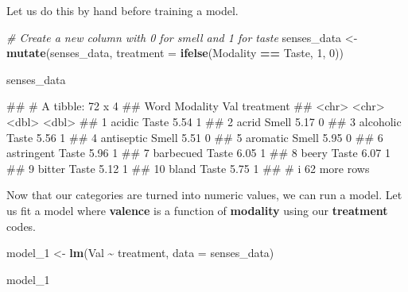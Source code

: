 \documentclass[
]{book}
\newenvironment{Shaded}{\begin{snugshade}}{\end{snugshade}}
\newcommand{\AttributeTok}[1]{\textcolor[rgb]{0.13,0.29,0.53}{#1}}
\newcommand{\CommentTok}[1]{\textcolor[rgb]{0.56,0.35,0.01}{\textit{#1}}}
\newcommand{\DecValTok}[1]{\textcolor[rgb]{0.00,0.00,0.81}{#1}}
\newcommand{\FunctionTok}[1]{\textcolor[rgb]{0.13,0.29,0.53}{\textbf{#1}}}
\newcommand{\NormalTok}[1]{#1}
\newcommand{\OtherTok}[1]{\textcolor[rgb]{0.56,0.35,0.01}{#1}}
\newcommand{\SpecialCharTok}[1]{\textcolor[rgb]{0.81,0.36,0.00}{\textbf{#1}}}
\newcommand{\StringTok}[1]{\textcolor[rgb]{0.31,0.60,0.02}{#1}}
\begin{document}
Let us do this by hand before training a model.

\begin{Shaded}
\begin{Highlighting}[]
\CommentTok{\# Create a new column with 0 for smell and 1 for taste}
\NormalTok{senses\_data }\OtherTok{\textless{}{-}} \FunctionTok{mutate}\NormalTok{(senses\_data, }\AttributeTok{treatment =} \FunctionTok{ifelse}\NormalTok{(Modality }\SpecialCharTok{==} \StringTok{\textquotesingle{}Taste\textquotesingle{}}\NormalTok{, }\DecValTok{1}\NormalTok{, }\DecValTok{0}\NormalTok{))}

\NormalTok{senses\_data}
\end{Highlighting}
\end{Shaded}

\begin{Shaded}
\begin{Highlighting}[]
\NormalTok{\#\# \# A tibble: 72 x 4}
\NormalTok{\#\#    Word       Modality   Val treatment}
\NormalTok{\#\#    \textless{}chr\textgreater{}      \textless{}chr\textgreater{}    \textless{}dbl\textgreater{}     \textless{}dbl\textgreater{}}
\NormalTok{\#\#  1 acidic     Taste     5.54         1}
\NormalTok{\#\#  2 acrid      Smell     5.17         0}
\NormalTok{\#\#  3 alcoholic  Taste     5.56         1}
\NormalTok{\#\#  4 antiseptic Smell     5.51         0}
\NormalTok{\#\#  5 aromatic   Smell     5.95         0}
\NormalTok{\#\#  6 astringent Taste     5.96         1}
\NormalTok{\#\#  7 barbecued  Taste     6.05         1}
\NormalTok{\#\#  8 beery      Taste     6.07         1}
\NormalTok{\#\#  9 bitter     Taste     5.12         1}
\NormalTok{\#\# 10 bland      Taste     5.75         1}
\NormalTok{\#\# \# i 62 more rows}
\end{Highlighting}
\end{Shaded}

Now that our categories are turned into numeric values, we can run a model. Let us fit a model where \textbf{valence} is a function of \textbf{modality} using our \textbf{treatment} codes.

\begin{Shaded}
\begin{Highlighting}[]
\NormalTok{model\_1 }\OtherTok{\textless{}{-}} \FunctionTok{lm}\NormalTok{(Val }\SpecialCharTok{\textasciitilde{}}\NormalTok{ treatment, }\AttributeTok{data =}\NormalTok{ senses\_data)}

\NormalTok{model\_1}
\end{Highlighting}
\end{Shaded}
\end{document}
